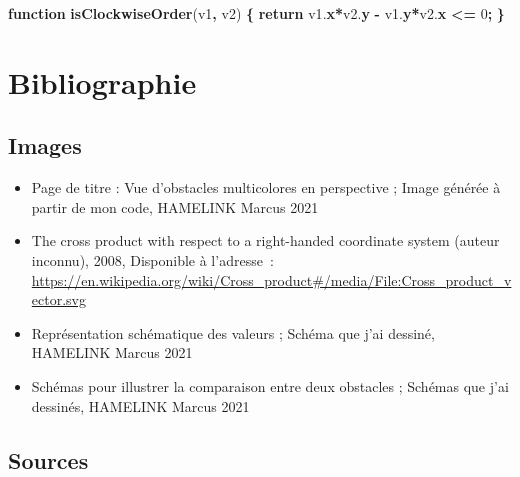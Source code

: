\documentclass[11pt,french,a4paper,]{article}
\newenvironment{Shaded}{\begin{snugshade}}{\end{snugshade}}
\newcommand{\AttributeTok}[1]{\textcolor[rgb]{0.00,0.36,0.77}{\textbf{#1}}}
\newcommand{\ControlFlowTok}[1]{\textcolor[rgb]{0.68,0.35,0.62}{\textbf{#1}}}
\newcommand{\DecValTok}[1]{\textcolor[rgb]{0.00,0.00,0.81}{#1}}
\newcommand{\KeywordTok}[1]{\textcolor[rgb]{0.68,0.35,0.62}{\textbf{#1}}}
\newcommand{\NormalTok}[1]{#1}
\newcommand{\OperatorTok}[1]{\textcolor[rgb]{0.81,0.36,0.00}{\textbf{#1}}}
\newcommand{\VariableTok}[1]{\textcolor[rgb]{0.90,0.33,0.00}{#1}}
\begin{document}
\begin{Shaded}
\begin{Highlighting}[]
\KeywordTok{function} \AttributeTok{isClockwiseOrder}\NormalTok{(v1}\OperatorTok{,}\NormalTok{ v2) }\OperatorTok{\{}
    \ControlFlowTok{return} \VariableTok{v1}\NormalTok{.}\AttributeTok{x}\OperatorTok{*}\VariableTok{v2}\NormalTok{.}\AttributeTok{y} \OperatorTok{-} \VariableTok{v1}\NormalTok{.}\AttributeTok{y}\OperatorTok{*}\VariableTok{v2}\NormalTok{.}\AttributeTok{x} \OperatorTok{<=} \DecValTok{0}\OperatorTok{;}
\OperatorTok{\}}
\end{Highlighting}
\end{Shaded}

\hypertarget{bibliographie}{%
\section{Bibliographie}\label{bibliographie}}

\hypertarget{images}{%
\subsection{Images}\label{images}}

\begin{itemize}
\item
  Page de titre : Vue d'obstacles multicolores en perspective ; Image
  générée à partir de mon code, HAMELINK Marcus 2021
\item
  The cross product with respect to a right-handed coordinate system
  (auteur inconnu), 2008, Disponible à l'adresse~:
  \url{https://en.wikipedia.org/wiki/Cross_product\#/media/File:Cross_product_vector.svg}
\item
  Représentation schématique des valeurs ; Schéma que j'ai dessiné,
  HAMELINK Marcus 2021
\item
  Schémas pour illustrer la comparaison entre deux obstacles ; Schémas
  que j'ai dessinés, HAMELINK Marcus 2021
\end{itemize}

\hypertarget{sources}{%
\subsection{Sources}\label{sources}}
\end{document}
